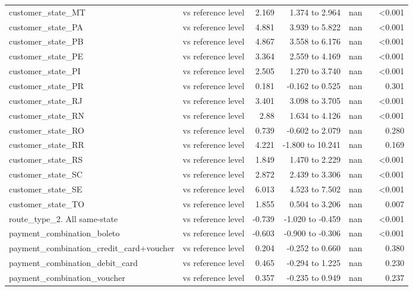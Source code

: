 \begin{table}[htbp]
\begin{tabular}{lrrrrrr}
customer\_state\_MT & vs reference level & 2.169 & 1.374 to 2.964 & nan &  & <0.001 \\
customer\_state\_PA & vs reference level & 4.881 & 3.939 to 5.822 & nan &  & <0.001 \\
customer\_state\_PB & vs reference level & 4.867 & 3.558 to 6.176 & nan &  & <0.001 \\
customer\_state\_PE & vs reference level & 3.364 & 2.559 to 4.169 & nan &  & <0.001 \\
customer\_state\_PI & vs reference level & 2.505 & 1.270 to 3.740 & nan &  & <0.001 \\
customer\_state\_PR & vs reference level & 0.181 & -0.162 to 0.525 & nan &  & 0.301 \\
customer\_state\_RJ & vs reference level & 3.401 & 3.098 to 3.705 & nan &  & <0.001 \\
customer\_state\_RN & vs reference level & 2.88 & 1.634 to 4.126 & nan &  & <0.001 \\
customer\_state\_RO & vs reference level & 0.739 & -0.602 to 2.079 & nan &  & 0.280 \\
customer\_state\_RR & vs reference level & 4.221 & -1.800 to 10.241 & nan &  & 0.169 \\
customer\_state\_RS & vs reference level & 1.849 & 1.470 to 2.229 & nan &  & <0.001 \\
customer\_state\_SC & vs reference level & 2.872 & 2.439 to 3.306 & nan &  & <0.001 \\
customer\_state\_SE & vs reference level & 6.013 & 4.523 to 7.502 & nan &  & <0.001 \\
customer\_state\_TO & vs reference level & 1.855 & 0.504 to 3.206 & nan &  & 0.007 \\
route\_type\_2. All same-state & vs reference level & -0.739 & -1.020 to -0.459 & nan &  & <0.001 \\
payment\_combination\_boleto & vs reference level & -0.603 & -0.900 to -0.306 & nan &  & <0.001 \\
payment\_combination\_credit\_card+voucher & vs reference level & 0.204 & -0.252 to 0.660 & nan &  & 0.380 \\
payment\_combination\_debit\_card & vs reference level & 0.465 & -0.294 to 1.225 & nan &  & 0.230 \\
payment\_combination\_voucher & vs reference level & 0.357 & -0.235 to 0.949 & nan &  & 0.237 \\
\bottomrule
\end{tabular}
\par\smallskip\begin{minipage}{\linewidth}\footnotesize \end{minipage}
\end{table}


